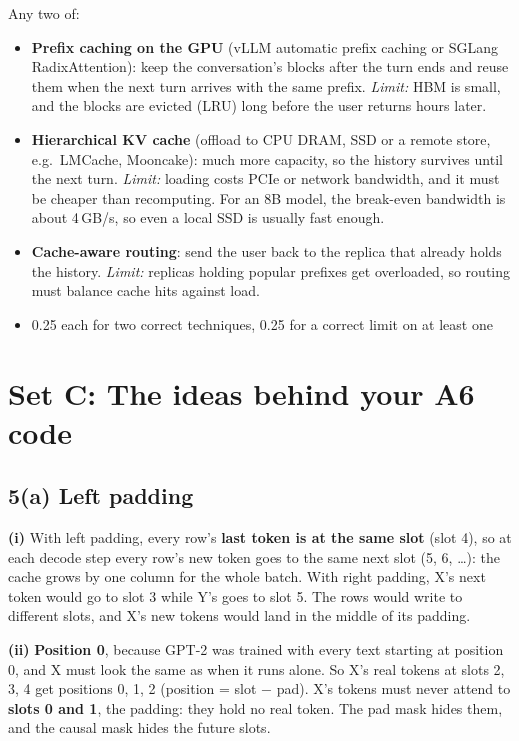 \documentclass[10pt]{article}
\newenvironment{rubric}{%
  \begin{tcolorbox}[colback=black!4, colframe=black!40, boxrule=0.4pt,
                    arc=0pt, title={Rubric}, fonttitle=\bfseries\small,
                    coltitle=black, colbacktitle=black!12]
  \small\begin{itemize}[leftmargin=*, nosep]}{%
  \end{itemize}\end{tcolorbox}}
\begin{document}
Any two of:
\begin{itemize}
\item \textbf{Prefix caching on the GPU} (vLLM automatic prefix caching or
  SGLang RadixAttention): keep the conversation's blocks after the turn
  ends and reuse them when the next turn arrives with the same prefix.
  \emph{Limit:} HBM is small, and the blocks are evicted (LRU) long before
  the user returns hours later.
\item \textbf{Hierarchical KV cache} (offload to CPU DRAM, SSD or a remote
  store, e.g.\ LMCache, Mooncake): much more capacity, so the history
  survives until the next turn. \emph{Limit:} loading costs PCIe or
  network bandwidth, and it must be cheaper than recomputing. For an 8B
  model, the break-even bandwidth is about 4\,GB/s, so even a local SSD is
  usually fast enough.
\item \textbf{Cache-aware routing}: send the user back to the replica that
  already holds the history. \emph{Limit:} replicas holding popular
  prefixes get overloaded, so routing must balance cache hits against
  load.
\end{itemize}

\begin{rubric}
\item 0.25 each for two correct techniques, 0.25 for a correct limit on at
  least one
\end{rubric}

\newpage
\section*{Set C: The ideas behind your A6 code}

\subsection*{5(a) Left padding}

\textbf{(i)} With left padding, every row's \textbf{last token is at the
same slot} (slot 4), so at each decode step every row's new token goes to
the same next slot (5, 6, \ldots): the cache grows by one column for the
whole batch. With right padding, X's next token would go to slot 3 while
Y's goes to slot 5. The rows would write to different slots, and X's new
tokens would land in the middle of its padding.

\textbf{(ii)} \textbf{Position 0}, because GPT-2 was trained with every
text starting at position 0, and X must look the same as when it runs
alone. So X's real tokens at slots 2, 3, 4 get positions 0, 1, 2
(position = slot $-$ pad). X's tokens must never attend to \textbf{slots 0
and 1}, the padding: they hold no real token. The pad mask hides them,
and the causal mask hides the future slots.
\end{document}
